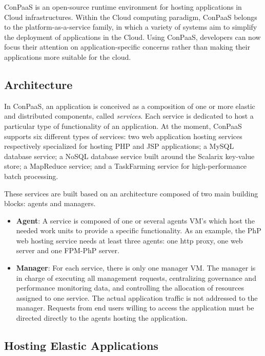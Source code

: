 

ConPaaS is an open-source runtime environment for hosting applications in Cloud infrastructures.
Within the Cloud computing paradigm, ConPaaS belongs to the platform-as-a-service family, 
in which a variety of systems aim to simplify the deployment of applications in the Cloud. Using ConPaaS,  developers can now focus their attention on application-specific concerns rather than making their applications more suitable for the cloud. 

\subsection{Architecture}

In ConPaaS, an application is conceived as a composition of one or more elastic and distributed components, called \emph{services}. Each service is dedicated to host a particular type of functionality of an application. At the moment, ConPaaS supports six different types of services: two web application hosting services respectively specialized for hosting PHP and JSP applications; a MySQL database service; a NoSQL database service built around the Scalarix key-value store; a MapReduce service; and a TaskFarming service for high-performance batch processing.  

These services are built based on an architecture composed of two main building blocks: agents and managers.  

\begin{itemize}
\item \textbf{Agent}: A service is composed of one or several agents VM's which host the needed work units to provide a specific functionality. As an example, the PhP web hosting service needs at least three agents: one http proxy, one web server and one FPM-PhP server.  

\item \textbf{Manager}: For each service, there is only one manager VM. The manager is in charge of executing all management requests, centralizing governance and performance monitoring data, and controlling the allocation of resources assigned to one service. The actual application traffic is not addressed to the manager. Requests from end users willing to access the application must be directed directly to the agents hosting the application.

\end{itemize}

\subsection{Hosting Elastic Applications}

